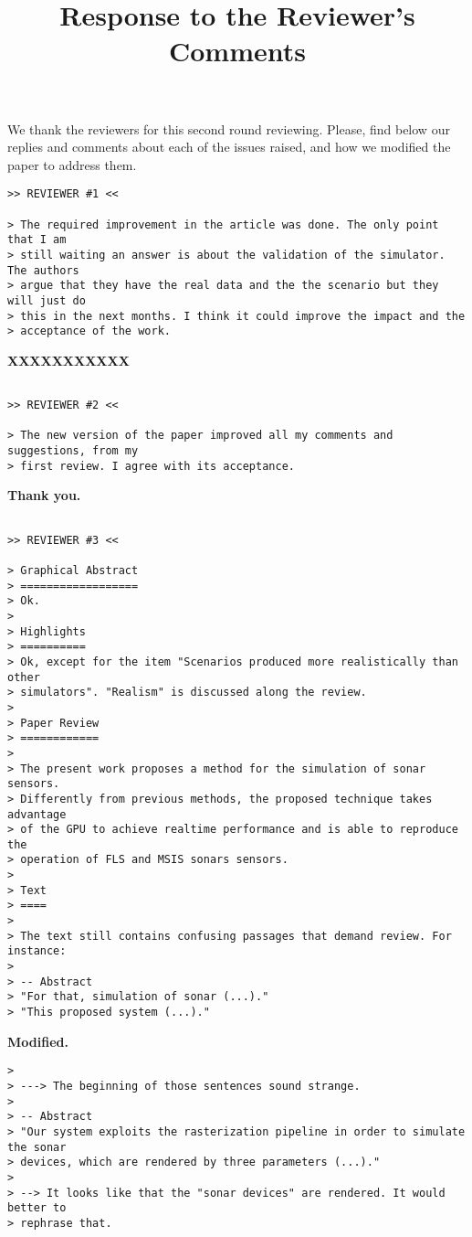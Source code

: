 \documentclass{article}
\title{Response to the Reviewer's Comments}
\begin{document}
\maketitle

We thank the reviewers for this second round reviewing. Please, find below our replies and comments about each of the issues raised, and how we modified the paper to address them.

\begin{verbatim}
>> REVIEWER #1 <<

> The required improvement in the article was done. The only point that I am
> still waiting an answer is about the validation of the simulator. The authors
> argue that they have the real data and the the scenario but they will just do
> this in the next months. I think it could improve the impact and the
> acceptance of the work.

\end{verbatim}

\textbf{XXXXXXXXXXX}

\begin{verbatim}

>> REVIEWER #2 <<

> The new version of the paper improved all my comments and suggestions, from my
> first review. I agree with its acceptance.

\end{verbatim}

\textbf{Thank you.}

\begin{verbatim}

>> REVIEWER #3 <<

> Graphical Abstract
> ==================
> Ok.
>
> Highlights
> ==========
> Ok, except for the item "Scenarios produced more realistically than other
> simulators". "Realism" is discussed along the review.
>
> Paper Review
> ============
>
> The present work proposes a method for the simulation of sonar sensors.
> Differently from previous methods, the proposed technique takes advantage
> of the GPU to achieve realtime performance and is able to reproduce the
> operation of FLS and MSIS sonars sensors.
>
> Text
> ====
>
> The text still contains confusing passages that demand review. For instance:
>
> -- Abstract
> "For that, simulation of sonar (...)."
> "This proposed system (...)."
\end{verbatim}

\textbf{Modified.}

\begin{verbatim}
>
> ---> The beginning of those sentences sound strange.
>
> -- Abstract
> "Our system exploits the rasterization pipeline in order to simulate the sonar
> devices, which are rendered by three parameters (...)."
>
> --> It looks like that the "sonar devices" are rendered. It would better to
> rephrase that.
\end{verbatim}
\end{document}
